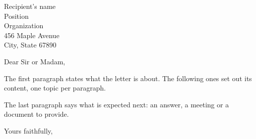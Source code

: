 \documentclass[version=last, paper=letter, fromalign=right, fromphone,
  fromemail, foldmarks=false, parskip=half]{scrlttr2}
\begin{document}
\begin{letter}{%
  Recipient's name\\
  Position\\
  Organization\\
  456 Maple Avenue\\
  City, State 67890%
}

\opening{Dear Sir or Madam,}

The first paragraph states what the letter is about. The following ones
set out its content, one topic per paragraph.

The last paragraph says what is expected next: an answer, a meeting or a
document to provide.

\closing{Yours faithfully,}


\end{letter}
\end{document}
